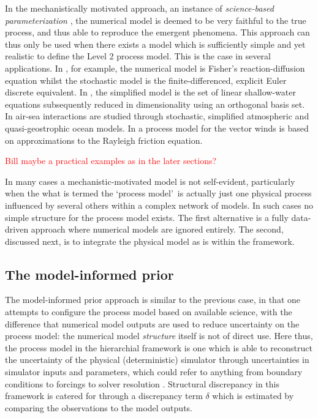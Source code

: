 \documentclass[10pt,a4paper]{article}
\newcommand{\red}{\textcolor{red}}
\begin{document}
In the mechanistically motivated approach, an instance of \emph{science-based parameterization} \citep{Leeds_2012}, the numerical model is deemed to be very faithful to the true process, and thus able to reproduce the emergent phenomena. This approach can thus only be used when there exists a model which is sufficiently simple and yet realistic to define the Level 2 process model. This is the case in several applications.  In \cite{Hooten_2008}, for example, the numerical model is Fisher's reaction-diffusion equation whilst the stochastic model is the finite-differenced, explicit Euler discrete equivalent. In \cite{Wikle_2001}, the simplified model is the set of linear shallow-water equations subsequently reduced in dimensionality using an orthogonal basis set. In \cite{Berliner_2003b} air-sea interactions are studied through stochastic, simplified atmospheric and quasi-geostrophic ocean models. In \cite{Milliff_2011} a process model for the vector winds is based on approximations to the Rayleigh friction equation. 

\red{Bill maybe a practical examples as in the later sections?}

In many cases a mechanistic-motivated model is not self-evident, particularly when the what is termed the \lq process model\rq~is actually just one physical process influenced by several others within a complex network of models. In such cases no simple structure for the process model exists. The first alternative is a fully data-driven approach where numerical models are ignored entirely. The second, discussed next, is to integrate the physical model as is within the framework.


\subsection{The model-informed prior}

The model-informed prior approach is similar to the previous case, in that one attempts to configure the process model based on available science, with the difference that numerical model outputs are used to reduce uncertainty on the process model: the numerical model \emph{structure} itself is not of direct use.  Here thus, the process model in the hierarchial framework is one which is able to reconstruct the uncertainty of the physical (deterministic) simulator through uncertainties in simulator inputs and parameters, which could refer to anything from boundary conditions to forcings to solver resolution \citep{Goldstein_2009}. Structural discrepancy in this framework is catered for through a discrepancy term $\delta$ which is estimated by comparing the observations to the model outputs.
\end{document}
